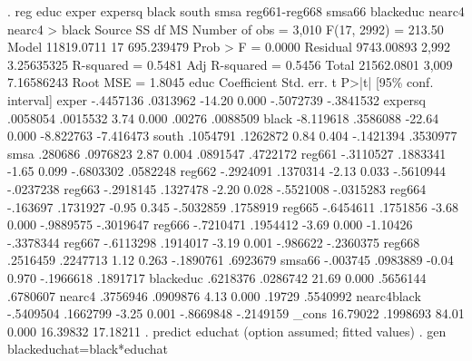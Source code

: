 . reg educ exper expersq black south smsa reg661-reg668 smsa66 blackeduc nearc4 nearc4
> black
{\smallskip}
      Source {\VBAR}       SS           df       MS      Number of obs   =     3,010
   F(17, 2992)     =    213.50
       Model {\VBAR}  11819.0711        17  695.239479   Prob > F        =    0.0000
    Residual {\VBAR}  9743.00893     2,992  3.25635325   R-squared       =    0.5481
   Adj R-squared   =    0.5456
       Total {\VBAR}  21562.0801     3,009  7.16586243   Root MSE        =    1.8045
{\smallskip}
        educ {\VBAR} Coefficient  Std. err.      t    P>|t|     [95\% conf. interval]
       exper {\VBAR}  -.4457136   .0313962   -14.20   0.000    -.5072739   -.3841532
     expersq {\VBAR}   .0058054   .0015532     3.74   0.000       .00276    .0088509
       black {\VBAR}  -8.119618   .3586088   -22.64   0.000    -8.822763   -7.416473
       south {\VBAR}   .1054791   .1262872     0.84   0.404    -.1421394    .3530977
        smsa {\VBAR}    .280686   .0976823     2.87   0.004     .0891547    .4722172
      reg661 {\VBAR}  -.3110527   .1883341    -1.65   0.099    -.6803302    .0582248
      reg662 {\VBAR}  -.2924091   .1370314    -2.13   0.033    -.5610944   -.0237238
      reg663 {\VBAR}  -.2918145   .1327478    -2.20   0.028    -.5521008   -.0315283
      reg664 {\VBAR}   -.163697   .1731927    -0.95   0.345    -.5032859    .1758919
      reg665 {\VBAR}  -.6454611   .1751856    -3.68   0.000    -.9889575   -.3019647
      reg666 {\VBAR}  -.7210471   .1954412    -3.69   0.000     -1.10426   -.3378344
      reg667 {\VBAR}  -.6113298   .1914017    -3.19   0.001     -.986622   -.2360375
      reg668 {\VBAR}   .2516459   .2247713     1.12   0.263    -.1890761    .6923679
      smsa66 {\VBAR}   -.003745   .0983889    -0.04   0.970    -.1966618    .1891717
   blackeduc {\VBAR}   .6218376   .0286742    21.69   0.000     .5656144    .6780607
      nearc4 {\VBAR}   .3756946   .0909876     4.13   0.000       .19729    .5540992
 nearc4black {\VBAR}  -.5409504   .1662799    -3.25   0.001    -.8669848   -.2149159
       _cons {\VBAR}   16.79022   .1998693    84.01   0.000     16.39832    17.18211
{\smallskip}
. predict educhat
(option {} assumed; fitted values)
{\smallskip}
. gen blackeduchat=black*educhat
{\smallskip}
